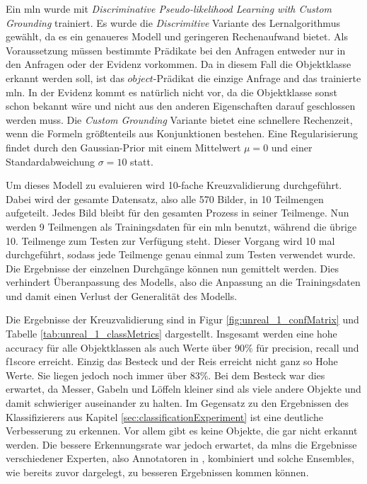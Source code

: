 Ein \gls{mln} wurde mit \textit{Discriminative Pseudo-likelihood Learning with Custom Grounding}   trainiert. Es wurde die \textit{Discrimitive} Variante des Lernalgorithmus gewählt, da es ein genaueres Modell und geringeren Rechenaufwand bietet. Als Voraussetzung müssen bestimmte Prädikate bei den Anfragen entweder nur in den Anfragen oder der Evidenz vorkommen. Da in diesem Fall die Objektklasse erkannt werden soll, ist das $object$-Prädikat die einzige Anfrage and das trainierte \gls{mln}. In der Evidenz kommt es natürlich nicht vor, da die Objektklasse sonst schon bekannt wäre und nicht aus den anderen Eigenschaften darauf geschlossen werden muss. Die \textit{Custom Grounding} Variante bietet eine schnellere Rechenzeit, wenn die Formeln größtenteils aus Konjunktionen bestehen. Eine Regularisierung findet durch den Gaussian-Prior mit einem Mittelwert $\mu = 0$ und einer Standardabweichung $\sigma = 10$ statt. \par   

Um dieses Modell zu evaluieren wird 10-fache Kreuzvalidierung durchgeführt. Dabei wird der gesamte Datensatz, also alle 570 Bilder, in 10 Teilmengen aufgeteilt. Jedes Bild bleibt für den gesamten Prozess in seiner Teilmenge. Nun werden 9 Teilmengen als Trainingsdaten für ein \gls{mln} benutzt, während die übrige 10. Teilmenge zum Testen zur Verfügung steht. Dieser Vorgang wird 10 mal durchgeführt, sodass jede Teilmenge genau einmal zum Testen verwendet wurde. Die Ergebnisse der einzelnen Durchgänge können nun gemittelt werden. Dies verhindert Überanpassung des Modells, also die Anpassung an die Trainingsdaten und damit einen Verlust der Generalität des Modells. \par

Die Ergebnisse der Kreuzvalidierung sind in Figur \ref{fig:unreal_1_confMatrix} und Tabelle \ref{tab:unreal_1_classMetrics} dargestellt. Insgesamt werden eine hohe \gls{accuracy} für alle Objektklassen als auch Werte über 90\% für \gls{precision}, \gls{recall} und \gls{f1score} erreicht. Einzig das Besteck und der Reis erreicht nicht ganz so Hohe Werte. Sie liegen jedoch noch immer über 83\%. Bei dem Besteck war dies erwartet, da Messer, Gabeln und Löffeln kleiner sind als viele andere Objekte und damit schwieriger auseinander zu halten. Im Gegensatz zu den Ergebnissen des Klassifizierers aus Kapitel \ref{sec:classificationExperiment} ist eine deutliche Verbesserung zu erkennen. Vor allem gibt es keine Objekte, die gar nicht erkannt werden. Die bessere Erkennungsrate war jedoch erwartet, da \glspl{mln} die Ergebnisse verschiedener Experten, also Annotatoren in \robosherlock, kombiniert und solche Ensembles, wie bereits zuvor dargelegt, zu besseren Ergebnissen kommen können.     

